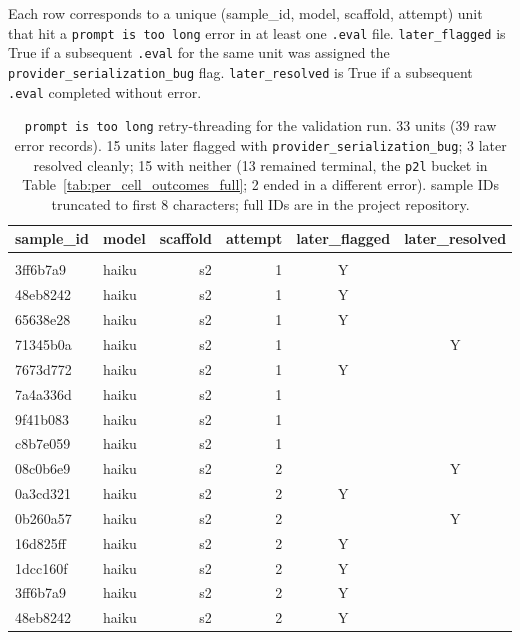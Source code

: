 \documentclass[10pt]{article} %
\begin{document}
    Each row corresponds to a unique (sample\_id, model, scaffold, attempt) unit that hit a \texttt{prompt is too long} error in at least one \texttt{.eval} file. \texttt{later\_flagged} is True if a subsequent \texttt{.eval} for the same unit was assigned the \texttt{provider\_serialization\_bug} flag. \texttt{later\_resolved} is True if a subsequent \texttt{.eval} completed without error.

    \begin{table}[t]
        \caption{\texttt{prompt is too long} retry-threading for the validation run. 33 units (39 raw error records). 15 units later flagged with \texttt{provider\_serialization\_bug}; 3 later resolved cleanly; 15 with neither (13 remained terminal, the \texttt{p2l} bucket in Table~\ref{tab:per_cell_outcomes_full}; 2 ended in a different error). sample IDs truncated to first 8 characters; full IDs are in the project repository.}
    \label{tab:prompt_too_long_threading}
    \begin{center}
    \begin{tabular}{llrrcc}
        \multicolumn{1}{c}{\bf sample\_id} &\multicolumn{1}{c}{\bf model} &\multicolumn{1}{c}{\bf scaffold} &\multicolumn{1}{c}{\bf attempt} &\multicolumn{1}{c}{\bf later\_flagged} &\multicolumn{1}{c}{\bf later\_resolved} \\
        \hline \\
        3ff6b7a9 &haiku &s2 &1 &Y & \\
        48eb8242 &haiku &s2 &1 &Y & \\
        65638e28 &haiku &s2 &1 &Y & \\
        71345b0a &haiku &s2 &1 & &Y \\
        7673d772 &haiku &s2 &1 &Y & \\
        7a4a336d &haiku &s2 &1 & & \\
        9f41b083 &haiku &s2 &1 & & \\
        c8b7e059 &haiku &s2 &1 & & \\
        08c0b6e9 &haiku &s2 &2 & &Y \\
        0a3cd321 &haiku &s2 &2 &Y & \\
        0b260a57 &haiku &s2 &2 & &Y \\
        16d825ff &haiku &s2 &2 &Y & \\
        1dcc160f &haiku &s2 &2 &Y & \\
        3ff6b7a9 &haiku &s2 &2 &Y & \\
        48eb8242 &haiku &s2 &2 &Y & \\

\end{tabular}
\end{center}
\end{table}
\end{document}
